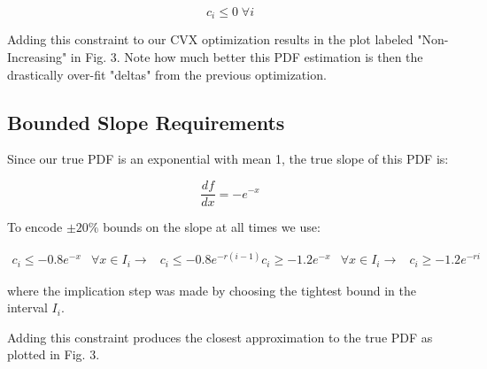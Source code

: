 \documentclass[a4paper]{article}
\begin{document}
\begin{equation}
  c_i \leq 0 \; \forall i
\end{equation}

Adding this constraint to our CVX optimization results in the plot labeled "Non-Increasing" in Fig. 3.
Note how much better this PDF estimation is then the drastically over-fit "deltas" from the previous optimization.

\subsection{Bounded Slope Requirements}
Since our true PDF is an exponential with mean 1, the true slope of this PDF is:

$$
\frac{df}{dx} = -e^{-x}
$$

To encode $\pm 20\%$ bounds on the slope at all times we use:

\begin{equation}
  \begin{aligned}
    c_i \leq -0.8 e^{-x} & \forall x \in I_i \rightarrow & c_i \leq -0.8 e^{-r(i-1)}
    c_i \geq -1.2 e^{-x} & \forall x \in I_i \rightarrow & c_i \geq -1.2 e^{-ri}
  \end{aligned}
\end{equation}

where the implication step was made by choosing the tightest bound in the interval $I_i$.

Adding this constraint produces the closest approximation to the true PDF as plotted in Fig. 3.
\end{document}
